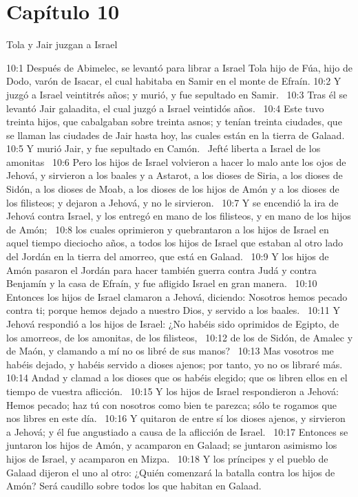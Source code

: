 \section*{Capítulo 10 }
Tola y Jair juzgan a Israel  

10:1 Después de Abimelec, se levantó para librar a Israel Tola hijo de Fúa, hijo de Dodo, varón de Isacar, el cual habitaba en Samir en el monte de Efraín. 
10:2 Y juzgó a Israel veintitrés años; y murió, y fue sepultado en Samir.  
10:3 Tras él se levantó Jair galaadita, el cual juzgó a Israel veintidós años.  
10:4 Este tuvo treinta hijos, que cabalgaban sobre treinta asnos; y tenían treinta ciudades, que se llaman las ciudades de Jair hasta hoy, las cuales están en la tierra de Galaad.  
10:5 Y murió Jair, y fue sepultado en Camón.  
Jefté liberta a Israel de los amonitas  
10:6 Pero los hijos de Israel volvieron a hacer lo malo ante los ojos de Jehová, y sirvieron a los baales y a Astarot, a los dioses de Siria, a los dioses de Sidón, a los dioses de Moab, a los dioses de los hijos de Amón y a los dioses de los filisteos; y dejaron a Jehová, y no le sirvieron.  
10:7 Y se encendió la ira de Jehová contra Israel, y los entregó en mano de los filisteos, y en mano de los hijos de Amón;  
10:8 los cuales oprimieron y quebrantaron a los hijos de Israel en aquel tiempo dieciocho años, a todos los hijos de Israel que estaban al otro lado del Jordán en la tierra del amorreo, que está en Galaad.  
10:9 Y los hijos de Amón pasaron el Jordán para hacer también guerra contra Judá y contra Benjamín y la casa de Efraín, y fue afligido Israel en gran manera.  
10:10 Entonces los hijos de Israel clamaron a Jehová, diciendo: Nosotros hemos pecado contra ti; porque hemos dejado a nuestro Dios, y servido a los baales.  
10:11 Y Jehová respondió a los hijos de Israel: ¿No habéis sido oprimidos de Egipto, de los amorreos, de los amonitas, de los filisteos,  
10:12 de los de Sidón, de Amalec y de Maón, y clamando a mí no os libré de sus manos?  
10:13 Mas vosotros me habéis dejado, y habéis servido a dioses ajenos; por tanto, yo no os libraré más.  
10:14 Andad y clamad a los dioses que os habéis elegido; que os libren ellos en el tiempo de vuestra aflicción.  
10:15 Y los hijos de Israel respondieron a Jehová: Hemos pecado; haz tú con nosotros como bien te parezca; sólo te rogamos que nos libres en este día.  
10:16 Y quitaron de entre sí los dioses ajenos, y sirvieron a Jehová; y él fue angustiado a causa de la aflicción de Israel.  
10:17 Entonces se juntaron los hijos de Amón, y acamparon en Galaad; se juntaron asimismo los hijos de Israel, y acamparon en Mizpa.  
10:18 Y los príncipes y el pueblo de Galaad dijeron el uno al otro: ¿Quién comenzará la batalla contra los hijos de Amón? Será caudillo sobre todos los que habitan en Galaad.  
